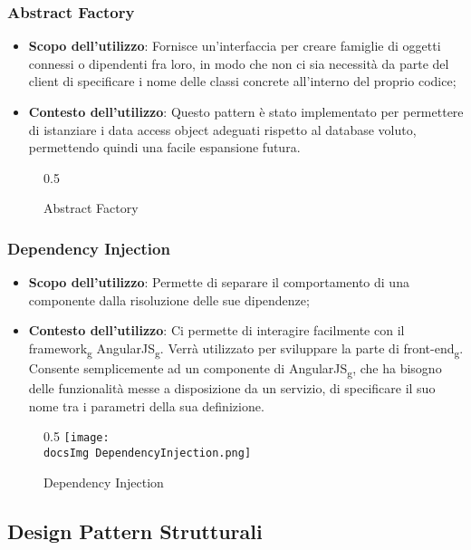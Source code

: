 		\subsubsection{Abstract Factory }
		\begin{itemize}\itemsep1pt
			\item \textbf{Scopo dell'utilizzo}: Fornisce un'interfaccia per creare famiglie di oggetti connessi o dipendenti fra loro, in modo che non ci sia necessità da parte del client di specificare i nome delle classi concrete all'interno del proprio codice;
			\item \textbf{Contesto dell'utilizzo}: Questo pattern è stato implementato per permettere di istanziare i data access object adeguati rispetto al database voluto, permettendo quindi una facile espansione futura. 
		\end{itemize}
		\begin{figure}[h]{0.5}
			\centering
			\caption{Abstract Factory}
			\label{fig. Abstract Factory}
		\end{figure}
		
		\subsubsection{Dependency Injection}
		\begin{itemize}\itemsep1pt
			\item\textbf{Scopo dell'utilizzo}: Permette di separare il comportamento di una componente dalla risoluzione delle sue dipendenze;
			\item\textbf{Contesto dell'utilizzo}: Ci permette di interagire facilmente con il framework\textsubscript{g} AngularJS\textsubscript{g}. Verrà utilizzato per sviluppare la parte di front-end\textsubscript{g}. Consente semplicemente ad un componente di AngularJS\textsubscript{g}, che ha bisogno delle funzionalità messe a disposizione da un servizio, di specificare il suo nome tra i parametri della sua definizione.
		\end{itemize}
		\begin{figure}[h]{0.5}
			\centering
			\texttt{[image: \\docsImg DependencyInjection.png]}
			\caption{Dependency Injection}
			\label{fig. Dependency Injection}
		\end{figure}

	\subsection{Design Pattern Strutturali}

